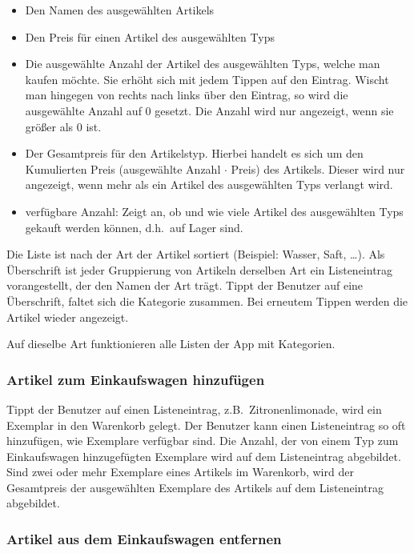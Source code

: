\begin{itemize}
	\item Den Namen des ausgewählten Artikels

	\item Den Preis für einen Artikel des ausgewählten Typs

	\item Die ausgewählte Anzahl der Artikel des ausgewählten Typs, welche man kaufen möchte.
	Sie erhöht sich mit jedem Tippen auf den Eintrag.
	Wischt man hingegen von rechts nach links über den Eintrag, so wird die ausgewählte Anzahl auf 0 gesetzt.
	Die Anzahl wird nur angezeigt, wenn sie größer als 0 ist.

	\item Der Gesamtpreis für den Artikelstyp.
	Hierbei handelt es sich um den Kumulierten Preis (ausgewählte Anzahl $\cdot$ Preis) des Artikels.
	Dieser wird nur angezeigt, wenn mehr als ein Artikel des ausgewählten Typs verlangt wird.

	\item verfügbare Anzahl: Zeigt an, ob und wie viele Artikel des ausgewählten Typs gekauft werden können, d.h.\ auf Lager sind.
\end{itemize}

Die Liste ist nach der Art der Artikel sortiert (Beispiel: Wasser, Saft, \ldots).
Als Überschrift ist jeder Gruppierung von Artikeln derselben Art ein Listeneintrag vorangestellt, der den Namen der Art trägt.
Tippt der Benutzer auf eine Überschrift, faltet sich die Kategorie zusammen.
Bei erneutem Tippen werden die Artikel wieder angezeigt.

Auf dieselbe Art funktionieren alle Listen der App mit Kategorien.

\subsubsection{Artikel zum Einkaufswagen hinzufügen} \label{subsubsec:shoppingcart-add-item}

Tippt der Benutzer auf einen Listeneintrag, z.B.\ Zitronenlimonade, wird ein Exemplar in den Warenkorb gelegt.
Der Benutzer kann einen Listeneintrag so oft hinzufügen, wie Exemplare verfügbar sind.
Die Anzahl, der von einem Typ zum Einkaufswagen hinzugefügten Exemplare wird auf dem Listeneintrag abgebildet.
Sind zwei oder mehr Exemplare eines Artikels im Warenkorb, wird der Gesamtpreis der ausgewählten Exemplare des Artikels auf dem Listeneintrag abgebildet.

\subsubsection{Artikel aus dem Einkaufswagen entfernen} \label{subsubsec:shoppingcart-del-item}

